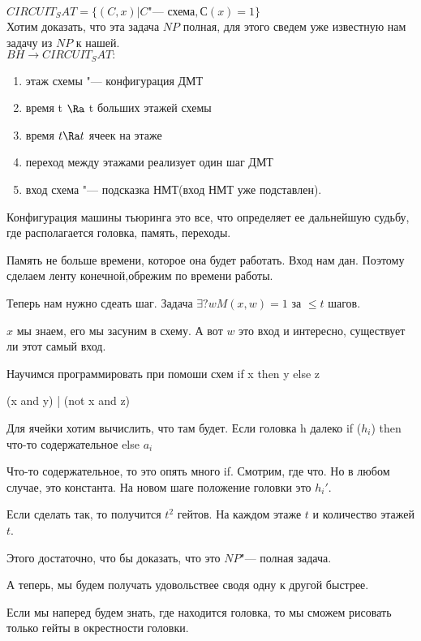 $CIRCUIT_SAT = \{(C, x)|C \text{"--- схема}, С(x) = 1\}$\\
Хотим доказать, что эта задача $NP$ полная, для 
этого сведем уже известную нам задачу из $NP$ к 
нашей.              \\
$BH \to CIRCUIT_SAT:$
\begin{enumerate}
\item этаж схемы "--- конфигурация ДМТ\\
\item время t $\Ra$ t больших этажей схемы
\item время $t \Ra t$ ячеек на этаже\\
\item переход между этажами реализует один шаг ДМТ
\item вход схема "--- подсказка НМТ(вход НМТ уже подставлен).
\end{enumerate}

\begin{Def}
Конфигурация машины тьюринга это все, что 
определяет ее дальнейшую судьбу, где располагается головка, 
память, переходы. 
\end{Def}

Память не больше времени, которое она будет работать. Вход 
нам дан. Поэтому сделаем ленту конечной,обрежим по времени работы. 

Теперь нам нужно сдеать шаг. 
Задача $\exists ? w M(x, w) = 1$ за $\le t$ шагов. 

$x$ мы знаем, его мы засуним в схему. А вот $w$ это вход и интересно,
существует ли этот самый вход. 

Научимся программировать при помоши схем 
if x then y else z

(x and y)  |  (not x and z)

Для ячейки хотим вычислить, что там будет. Если головка h далеко
if ($h_i$) then что-то содержательное
else $a_i$

Что-то содержательное, то это опять много if. Смотрим, где что. Но 
в любом случае, это константа. 
На новом шаге положение головки это $h_i'$.

Если сделать так, то получится $t^2$ гейтов. На каждом этаже $t$ и 
количество этажей $t$.

Этого достаточно, что бы доказать, что это $NP$"--- полная задача. 

А теперь, мы будем получать удовольствее сводя одну к другой быстрее.

Если мы наперед будем знать, где находится головка, то мы сможем рисовать
только гейты в окрестности головки.

